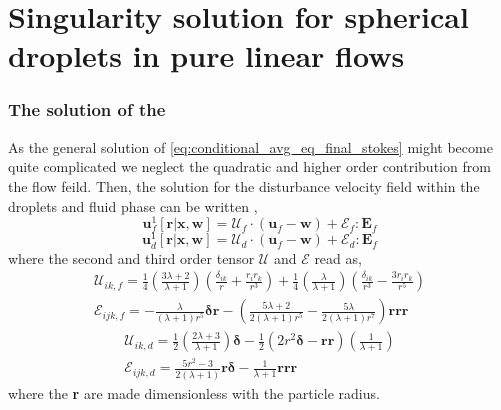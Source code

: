 
\section{Singularity solution for spherical droplets in pure linear flows}


\subsubsection{The solution of the}
As the general solution of \ref{eq:conditional_avg_eq_final_stokes} might become quite complicated we neglect the quadratic and higher order contribution from the flow feild. 
Then, the solution for the disturbance velocity field within the droplets and fluid phase can be written \citep{leal2007advanced}, 
\begin{equation}
    \textbf{u}_f^1[\textbf{r}|\textbf{x},\textbf{w}]
    = 
    \mathcal{U}_f\cdot (\textbf{u}_f - \textbf{w})
    + \mathcal{E}_f: \textbf{E}_{f}
\end{equation}
\begin{equation}
    \textbf{u}_d^1[\textbf{r}|\textbf{x},\textbf{w}]
    = 
    \mathcal{U}_d\cdot (\textbf{u}_f - \textbf{w})
    + \mathcal{E}_d: \textbf{E}_{f}
\end{equation}
where the second and third order tensor $\mathcal{U}$ and $\mathcal{E}$ read as, 
\begin{align}
    \mathcal{U}_{ik,f} = 
    \frac{1}{4}\left(\frac{3\lambda + 2}{\lambda +1}\right)
    \left(\frac{\delta_{ik}}{r} + \frac{r_ir_k}{r^3}\right) 
    + 
    \frac{1}{4}\left(\frac{\lambda}{\lambda +1}\right)
    \left(\frac{\delta_{ik}}{r^3} - \frac{3r_ir_k}{r^5}\right)  \\
    \mathcal{E}_{ijk,f}
    =
    -\frac{\lambda}{(\lambda + 1)r^5} \bm\delta\textbf{r}
    -\left(\frac{5\lambda +2}{2(\lambda +1 )r^5} - \frac{5\lambda}{2(\lambda+1)r^7}\right) \textbf{rrr}
\end{align}
\begin{align}
    \mathcal{U}_{ik,d} = 
    \frac{1}{2}\left(\frac{2\lambda +3}{\lambda +1}\right)\bm\delta
    -\frac{1}{2} (2r^2 \bm\delta - \textbf{rr})
    \left(\frac{1}{\lambda +1}\right)\\
    \mathcal{E}_{ijk,d}
    =
    \frac{5r^2 -3}{2(\lambda +1)} \textbf{r}\bm\delta
    - \frac{1}{\lambda+1}\textbf{rrr}
\end{align}
where the \textbf{r} are made dimensionless with the particle radius. 

